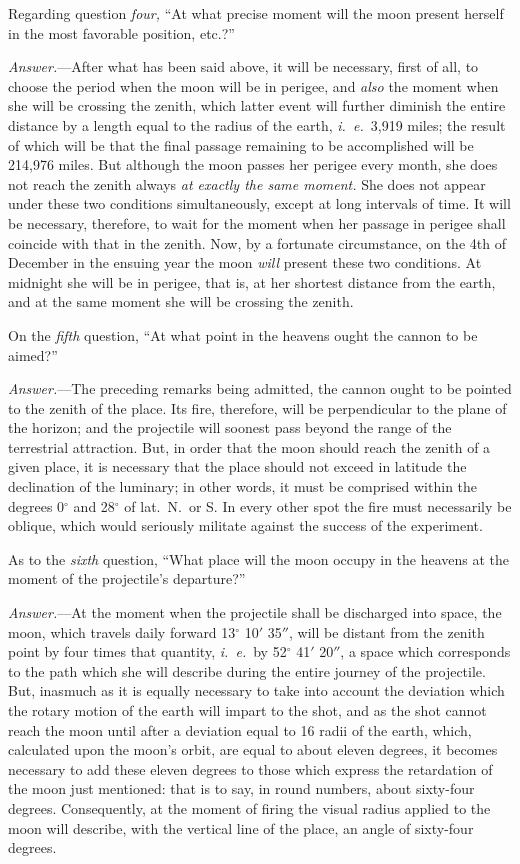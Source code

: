\documentclass[a4paper]{article}
\begin{document}
Regarding question \emph{four,} ``At what precise moment will the moon present
herself in the most favorable position, etc.?''

\emph{Answer.}---After what has been said above, it will be necessary, first of
all, to choose the period when the moon will be in perigee, and \emph{also} the
moment when she will be crossing the zenith, which latter event will further
diminish the entire distance by a length equal to the radius of the earth,
\emph{i.~e.}\ 3,919 miles; the result of which will be that the final passage
remaining to be accomplished will be 214,976 miles. But although the moon
passes her perigee every month, she does not reach the zenith always \emph{at
exactly the same moment.} She does not appear under these two conditions
simultaneously, except at long intervals of time. It will be necessary,
therefore, to wait for the moment when her passage in perigee shall coincide
with that in the zenith. Now, by a fortunate circumstance, on the 4th of
December in the ensuing year the moon \emph{will} present these two conditions.
At midnight she will be in perigee, that is, at her shortest distance from the
earth, and at the same moment she will be crossing the zenith.

On the \emph{fifth} question, ``At what point in the heavens ought the cannon
to be aimed?''

\emph{Answer.}---The preceding remarks being admitted, the cannon ought to be
pointed to the zenith of the place. Its fire, therefore, will be perpendicular
to the plane of the horizon; and the projectile will soonest pass beyond the
range of the terrestrial attraction. But, in order that the moon should reach
the zenith of a given place, it is necessary that the place should not exceed
in latitude the declination of the luminary; in other words, it must be
comprised within the degrees 0$^\circ$ and 28$^\circ$ of lat.\ N.\ or S.
In every other spot the fire must necessarily be oblique, which would seriously
militate against the success of the experiment.

As to the \emph{sixth} question, ``What place will the moon occupy in the
heavens at the moment of the projectile’s departure?''

\emph{Answer.}---At the moment when the projectile shall be discharged into
space, the moon, which travels daily forward 13$^\circ$ 10$'$ 35$''$, will be
distant from the zenith point by four times that quantity, \emph{i.~e.}\ by
52$^\circ$ 41$'$ 20$''$, a space which corresponds to the path which she will
describe during the entire journey of the projectile. But, inasmuch as it is
equally necessary to take into account the deviation which the rotary motion of
the earth will impart to the shot, and as the shot cannot reach the moon until
after a deviation equal to 16 radii of the earth, which, calculated upon the
moon’s orbit, are equal to about eleven degrees, it becomes necessary to add
these eleven degrees to those which express the retardation of the moon just
mentioned: that is to say, in round numbers, about sixty-four degrees.
Consequently, at the moment of firing the visual radius applied to the moon
will describe, with the vertical line of the place, an angle of sixty-four
degrees.
\end{document}
